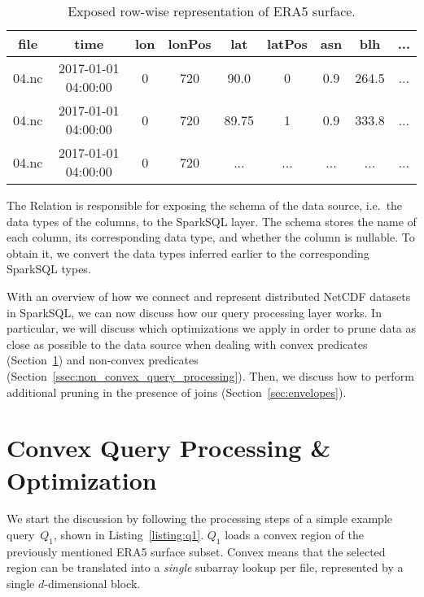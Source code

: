 \documentclass[conference]{IEEEtran}
\begin{document}
\begin{table}[h!]
\setlength\tabcolsep{2.7pt}
\begin{tabular}{| c | c | c | c | c | c | c | c | c |}
\hline
\cellcolor{gray!25}\textbf{file} & \cellcolor{red!25}\textbf{time} & \cellcolor{green!25}\textbf{lon} & \cellcolor{green!25}\textbf{lonPos} & \cellcolor{green!25}\textbf{lat} & \cellcolor{green!25}\textbf{latPos} & \cellcolor{blue!25}\textbf{asn} & \cellcolor{blue!25}\textbf{blh} & \cellcolor{blue!25}...\\\hline\hline
04.nc & 2017-01-01 04:00:00 & 0 & 720 & 90.0 & 0 & 0.9 & 264.5 & ...\\\hline 
04.nc & 2017-01-01 04:00:00 & 0 & 720 & 89.75 & 1 & 0.9 & 333.8 & ...\\ \hline
04.nc & 2017-01-01 04:00:00 & 0 & 720 & ... & ... & ... & ... & ...\\  
\hline    
\end{tabular}
\caption{Exposed row-wise representation of ERA5 surface.}
\label{table:schema}
\end{table}

The Relation is responsible for exposing the schema of the data source, i.e.\ the data types of the columns, to the SparkSQL layer. The schema stores the name of each column, its corresponding data type, and whether the column is nullable. To obtain it, we convert the data types inferred earlier to the corresponding SparkSQL types.

With an overview of how we connect and represent distributed NetCDF datasets in SparkSQL, we can now discuss how our query processing layer works. In particular, we will discuss which optimizations we apply in order to prune data as close as possible to the data source when dealing with convex predicates (Section~\ref{ssec:convex_query_processing}) and non-convex predicates (Section~\ref{ssec:non_convex_query_processing}). Then, we discuss how to perform additional pruning in the presence of joins (Section~\ref{sec:envelopes}).

\section{Convex Query Processing \& Optimization}
\label{ssec:convex_query_processing}

We start the discussion by following the processing steps of a simple example query~$Q_1$, shown in Listing~\ref{listing:q1}. $Q_1$ loads a convex region of the previously mentioned ERA5 surface subset. Convex means that the selected region can be translated into a \textit{single} subarray lookup per file, represented by a single $d$-dimensional block.
\end{document}
